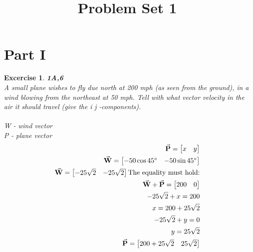 \documentclass[11pt]{article}
\newtheorem{excercise}{Excercise}
\begin{document}
    \title{Problem Set 1}
    \maketitle

    \section{Part I}

    \begin{excercise}
        \textbf{1A,6}\\
        A small plane wishes to fly due north at 200 mph (as seen from the ground), in a wind blowing from the northeast at 50 mph. Tell with what vector velocity in the air it should travel (give the i j -components).\\
        \\
        W - wind vector\\
        P - plane vector\\
        \begin{align}
            \va{P}=\bmqty{x & y}\\
            \va{W}=\bmqty{-50\cos{\ang{45}} & -50\sin{\ang{45}}}\\
            \va{W}=\bmqty{-25\sqrt{2} & -25\sqrt{2}}
            \text{The equality must hold:}\\
            \va{W} + \va{P} = \bmqty{200 & 0}\\
            -25\sqrt{2} + x = 200\\
            x = 200 + 25\sqrt{2}\\
            -25\sqrt{2} + y = 0\\
            y = 25\sqrt{2}\\
            \va{P} = \bmqty{200 + 25\sqrt{2} & 25\sqrt{2}}
        \end{align}

    \end{excercise}
\end{document}
